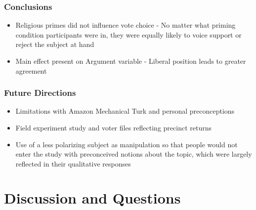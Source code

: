 \documentclass[14pt]{beamer}
\begin{document}
\begin{frame}
\frametitle{Conclusions}
\begin{itemize}
	\item Religious primes did not influence vote choice - No matter what priming condition participants were in, they were equally likely to voice support or reject the subject at hand
	\item Main effect present on Argument variable - Liberal position leads to greater agreement 
\end{itemize}
\end{frame}

\begin{frame}
\frametitle{Future Directions}
\begin{itemize}
	\item Limitations with Amazon Mechanical Turk and personal preconceptions
	\item Field experiment study and voter files reflecting precinct returns
	\item Use of a less polarizing subject as manipulation so that people would not enter the study with preconceived notions about the topic, which were largely reflected in their qualitative responses
\end{itemize}
\end{frame}

\section{Discussion and Questions}
\end{document}
